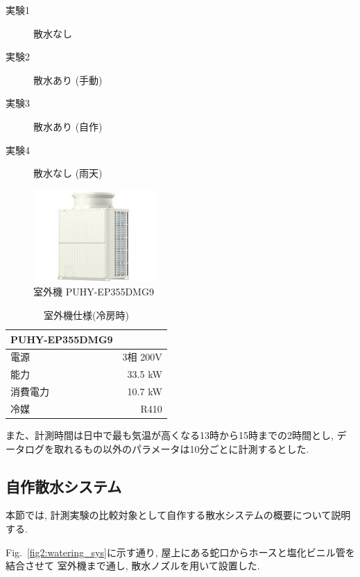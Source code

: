 \documentclass[a4j,fleqn,dvipdfmx,uplatex]{jsarticle}
\newcommand{\figref}[1]{Fig.\ \ref{#1}}
\begin{document}
\begin{description}
  \item[  実験1 ] 散水なし
  \item[  実験2 ] 散水あり (手動)
  \item[  実験3 ] 散水あり (自作)
  \item[  実験4 ] 散水なし (雨天)
\end{description}

\begin{figure}[htb]
  \centering
  \includegraphics[width=0.7\linewidth]{img/PUHY-EP335DMG9.jpg}
  \caption{室外機 PUHY-EP355DMG9}
  \label{fig:condensing_unit}
\end{figure}

\begin{table}[htb]
  \caption{室外機仕様(冷房時)}
  \label{table:hard}
  \centering
  \begin{tabular}{lr}
    PUHY-EP355DMG9 & \\
    \hline \hline
    電源 & 3相 200V \\
    能力 & 33.5 kW \\
    消費電力 & 10.7 kW \\
    冷媒 & R410 \\
    \hline
  \end{tabular}
\end{table}

また、計測時間は日中で最も気温が高くなる13時から15時までの2時間とし, 
データログを取れるもの以外のパラメータは10分ごとに計測するとした. 


\subsection{自作散水システム}
本節では, 計測実験の比較対象として自作する散水システムの概要について説明する. 

\figref{fig2:watering_sys}に示す通り, 屋上にある蛇口からホースと塩化ビニル管を結合させて
室外機まで通し, 散水ノズルを用いて設置した. 
\end{document}
